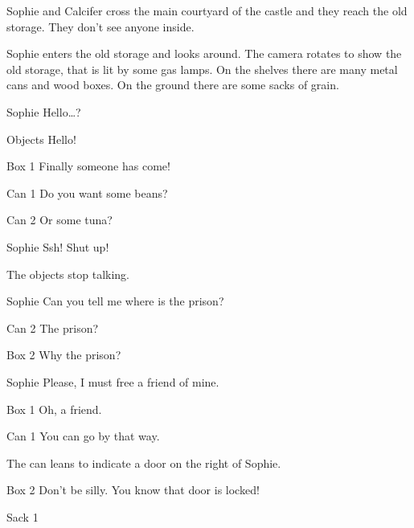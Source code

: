 Sophie and Calcifer cross the main courtyard of the castle and they reach the old storage. They don't see anyone inside.

\begin{screenplay}

Sophie enters the old storage and looks around. The camera rotates to show the old storage, that is lit by some gas lamps. On the shelves there are many metal cans and wood boxes. On the ground there are some sacks of grain.

\begin{dialogue}{Sophie}
Hello…?
\end{dialogue}
\begin{dialogue}[cheerful]{Objects}
 Hello!
\end{dialogue}
\begin{dialogue}{Box 1}
 Finally someone has come!
\end{dialogue}
\begin{dialogue}{Can 1}
 Do you want some beans?
\end{dialogue}
\begin{dialogue}{Can 2}
Or some tuna?
\end{dialogue}
\begin{dialogue}[worried]{Sophie}
Ssh! Shut up!
\end{dialogue}
The objects stop talking.
\begin{dialogue}{Sophie}
Can you tell me where is the prison?
\end{dialogue}
\begin{dialogue}[surprised]{Can 2}
The prison?
\end{dialogue}
\begin{dialogue}[surprised]{Box 2}
Why the prison?
\end{dialogue}
\begin{dialogue}{Sophie}
Please, I must free a friend of mine.
\end{dialogue}
\begin{dialogue}{Box 1}
Oh, a friend.
\end{dialogue}
\begin{dialogue}{Can 1}
You can go by that way.
\end{dialogue}
The can leans to indicate a door on the right of Sophie.
\begin{dialogue}{Box 2}
Don't be silly. You know that door is locked!
\end{dialogue}
\begin{dialogue}{Sack 1}

\end{dialogue}
\end{screenplay}
